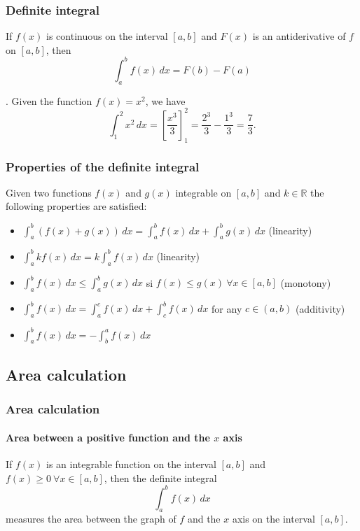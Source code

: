 \begin{frame}
\frametitle{Definite integral}
\begin{theorem}
If $f(x)$ is continuous on the interval $[a,b]$ and $F(x)$ is an antiderivative of $f$ on $[a,b]$, then
\[
\int_a^b f(x)\,dx = F(b)-F(a)
\]
\end{theorem}
. Given the function $f(x)=x^2$, we have
\[
\int_1^2 x^2\,dx = \left[\frac{x^3}{3}\right]_1^2 = \frac{2^3}{3}-\frac{1^3}{3} = \frac{7}{3}.
\]
\end{frame}


\begin{frame}
\frametitle{Properties of the definite integral}
Given two functions $f(x)$ and $g(x)$ integrable on $[a,b]$ and $k \in \mathbb{R}$ the following properties are satisfied:
\begin{itemize}
\item $\int_{a}^{b}(f(x)+g(x))\,dx=\int_{a}^{b}f(x)\,dx+\int_{a}^{b}g(x)\,dx$ (linearity)
\item $\int_{a}^{b}{kf(x)}\,dx=k\int_{a}^{b}{f(x)}\,dx$ (linearity)
\item $\int_{a}^{b}{f(x)\,dx} \leq \int_{a}^{b}{g(x)\,dx}$ si $f(x)\leq g(x)\ \forall x \in [a,b]$ (monotony)
\item $\int_{a}^{b}{f(x)\,dx} = \int_{a}^{c}{f(x)\,dx}+\int_{c}^{b}{f(x)\,dx}$ for any $c\in(a,b)$ (additivity)
\item $\int_a^b f(x)\,dx = -\int_b^a f(x)\,dx$
\end{itemize}
\end{frame}



\subsection{Area calculation}
\begin{frame}
\frametitle{Area calculation}
\framesubtitle{Area between a positive function and the $x$ axis}
If $f(x)$ is an integrable function on the interval $[a,b]$ and $f(x)\geq 0\ \forall x\in[a,b]$, then the definite integral 
\[\int_a^b f(x)\,dx\]
measures the area between the graph of $f$ and the $x$ axis on the interval $[a,b]$.
\begin{center}

\end{center}
\end{frame}


